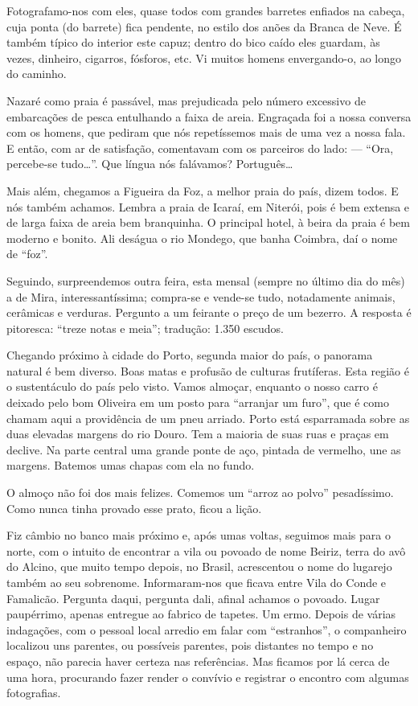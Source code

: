 Fotografamo-nos com eles, quase todos com grandes barretes enfiados na cabeça, cuja ponta (do barrete) fica pendente, no estilo dos anões da Branca de Neve. É também típico do interior este capuz; dentro do bico caído eles guardam, às vezes, dinheiro, cigarros, fósforos, etc. Vi muitos homens envergando-o, ao longo do caminho.

Nazaré como praia é passável, mas prejudicada pelo número excessivo de embarcações de pesca entulhando a faixa de areia. Engraçada foi a nossa conversa com os homens, que pediram que nós repetíssemos mais de uma vez a nossa fala. E então, com ar de satisfação, comentavam com os parceiros do lado: --- ``Ora, percebe-se tudo\ldots''. Que língua nós falávamos? Português\ldots

Mais além, chegamos a Figueira da Foz, a melhor praia do país, dizem todos. E nós também achamos. Lembra a praia de Icaraí, em Niterói, pois é bem extensa e de larga faixa de areia bem branquinha. O principal hotel, à beira da praia é bem moderno e bonito. Ali deságua o rio Mondego, que banha Coimbra, daí o nome de ``foz''.

Seguindo, surpreendemos outra feira, esta mensal (sempre no último dia do mês) a de Mira, interessantíssima; compra-se e vende-se tudo, notadamente animais, cerâmicas e verduras. Pergunto a um feirante o preço de um bezerro. A resposta é pitoresca: ``treze notas e meia''; tradução: 1.350 escudos.

Chegando próximo à cidade do Porto, segunda maior do país, o panorama natural é bem diverso. Boas matas e profusão de culturas frutíferas. Esta região é o sustentáculo do país pelo visto. Vamos almoçar, enquanto o nosso carro é deixado pelo bom Oliveira em um posto para ``arranjar um furo'', que é como chamam aqui a providência de um pneu arriado. Porto está esparramada sobre as duas elevadas margens do rio Douro. Tem a maioria de suas ruas e praças em declive. Na parte central uma grande ponte de aço, pintada de vermelho, une as margens. Batemos umas chapas com ela no fundo.

O almoço não foi dos mais felizes. Comemos um ``arroz ao polvo'' pesadíssimo. Como nunca tinha provado esse prato, ficou a lição.

Fiz câmbio no banco mais próximo e, após umas voltas, seguimos mais para o norte, com o intuito de encontrar a vila ou povoado de nome Beiriz, terra do avô do Alcino, que muito tempo depois, no Brasil, acrescentou o nome do lugarejo também ao seu sobrenome. Informaram-nos que ficava entre Vila do Conde e Famalicão. Pergunta daqui, pergunta dali, afinal achamos o povoado. Lugar paupérrimo, apenas entregue ao fabrico de tapetes. Um ermo. Depois de várias indagações, com o pessoal local arredio em falar com ``estranhos'', o companheiro localizou uns parentes, ou possíveis parentes, pois distantes no tempo e no espaço, não parecia haver certeza nas referências. Mas ficamos por lá cerca de uma hora, procurando fazer render o convívio e registrar o encontro com algumas fotografias.


